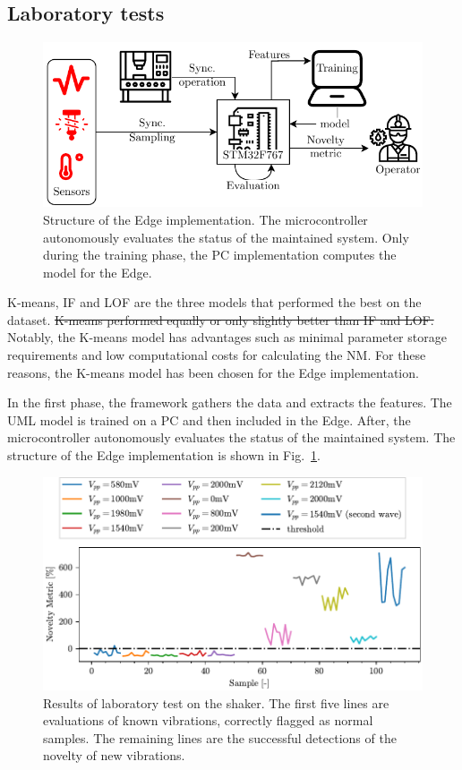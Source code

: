 \documentclass[a4paper, 10pt, conference, oneside]{ieeeconf}
\providecommand{\DIFaddtex}[1]{{\protect\color{blue}\uwave{#1}}} %
\providecommand{\DIFdeltex}[1]{{\protect\color{red}\sout{#1}}}                      %
\providecommand{\DIFdelbegin}{} %
\providecommand{\DIFdelend}{} %
\providecommand{\DIFaddFL}[1]{\DIFadd{#1}} %
\providecommand{\DIFaddbeginFL}{} %
\providecommand{\DIFaddendFL}{} %
\providecommand{\DIFadd}[1]{\texorpdfstring{\DIFaddtex{#1}}{#1}} %
\providecommand{\DIFdel}[1]{\texorpdfstring{\DIFdeltex{#1}}{}} %
\newcommand{\DIFscaledelfig}{0.5}
\newlength{\DIFdelgraphicswidth} %
\newlength{\DIFdelgraphicsheight} %
\newcommand{\DIFaddincludegraphics}[2][]{{\color{blue}\fbox{\DIFOincludegraphics[#1]{#2}}}} %
\newcommand{\DIFdelincludegraphics}[2][]{%
\sbox{\DIFdelgraphicsbox}{\DIFOincludegraphics[#1]{#2}}%
\settoboxwidth{\DIFdelgraphicswidth}{\DIFdelgraphicsbox} %
\settoboxtotalheight{\DIFdelgraphicsheight}{\DIFdelgraphicsbox} %
\scalebox{\DIFscaledelfig}{%
\parbox[b]{\DIFdelgraphicswidth}{\usebox{\DIFdelgraphicsbox}\\[-\baselineskip] \rule{\DIFdelgraphicswidth}{0em}}\llap{\resizebox{\DIFdelgraphicswidth}{\DIFdelgraphicsheight}{%
\setlength{\unitlength}{\DIFdelgraphicswidth}%
\begin{picture}(1,1)%
\thicklines\linethickness{2pt} %
{\color[rgb]{1,0,0}\put(0,0){\framebox(1,1){}}}%
{\color[rgb]{1,0,0}\put(0,0){\line( 1,1){1}}}%
{\color[rgb]{1,0,0}\put(0,1){\line(1,-1){1}}}%
\end{picture}%
}\hspace*{3pt}}} %
} %
\DeclareRobustCommand{\DIFdelbegin}{\DIFOdelbegin \let\includegraphics\DIFdelincludegraphics} %
\DeclareRobustCommand{\DIFdelend}{\DIFOaddend \let\includegraphics\DIFOincludegraphics} %
\DeclareRobustCommand{\DIFaddbeginFL}{\DIFOaddbeginFL \let\includegraphics\DIFaddincludegraphics} %
\DeclareRobustCommand{\DIFaddendFL}{\DIFOaddendFL \let\includegraphics\DIFOincludegraphics} %
\begin{document}
\subsection{Laboratory tests}

\begin{figure}
    \includegraphics[width=\linewidth]{images/EmbeddedStructure.pdf}
    \caption{Structure of the Edge implementation. The microcontroller autonomously evaluates the status of the maintained system. Only during the training phase, the PC implementation computes the model for the Edge.}
    \label{fig:embedded}
\end{figure}

K-means, IF and LOF are the three models that performed the best on the dataset. \DIFdelbegin \DIFdel{K-means performed equally or only slightly better than IF and LOF. }\DIFdelend Notably, the K-means model has advantages such as minimal parameter storage requirements and low computational costs for calculating the NM. For these reasons, the K-means model has been chosen for the Edge implementation.

In the first phase, the framework gathers the data and extracts the features. The UML model is trained on a PC and then included in the Edge. After, the microcontroller autonomously evaluates the status of the maintained system. The structure of the Edge implementation is shown in Fig.~\ref{fig:embedded}. 

\begin{figure}
    \includegraphics[width=\linewidth]{images/Test02_LOF.pdf}
    \caption{Results of \DIFaddbeginFL \DIFaddFL{a }\DIFaddendFL laboratory test on the shaker. The first five lines are evaluations of known vibrations, correctly flagged as normal samples. The remaining lines are the successful detections of the novelty of new vibrations.}
    \label{fig:shaker}
\end{figure}
\end{document}
